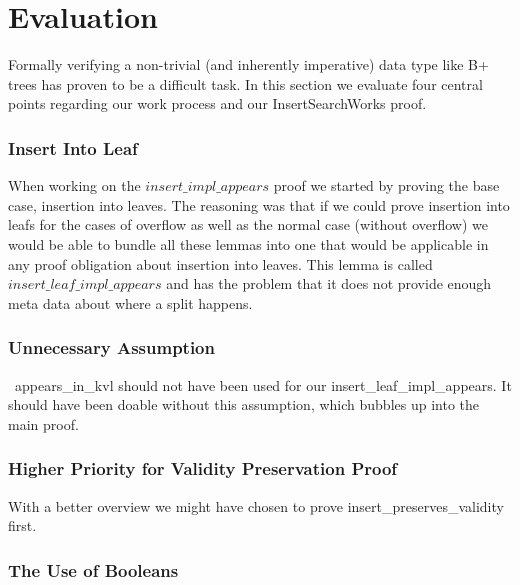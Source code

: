 \section{Evaluation}
\label{sec:Evaluation}
Formally verifying a non-trivial (and inherently imperative) data type like B+ trees has proven to be a difficult task. In this section we evaluate four central points regarding our work process and our InsertSearchWorks proof.
\subsubsection{Insert Into Leaf}
When working on the $insert\_impl\_appears$ proof we started by proving the base case, insertion into leaves. The reasoning was that if we could prove insertion into leafs for the cases of overflow as well as the normal case (without overflow) we would be able to bundle all these lemmas into one that would be applicable in any proof obligation about insertion into leaves. This lemma is called $insert\_leaf\_impl\_appears$ and has the problem that it does not provide enough meta data about where a split happens.
\subsubsection{Unnecessary Assumption}
~appears_in_kvl should not have been used for our insert_leaf_impl_appears. It should have been doable without this assumption, which bubbles up into the main proof.
\subsubsection{Higher Priority for Validity Preservation Proof}
With a better overview we might have chosen to prove insert_preserves_validity first.
\subsubsection{The Use of Booleans}

